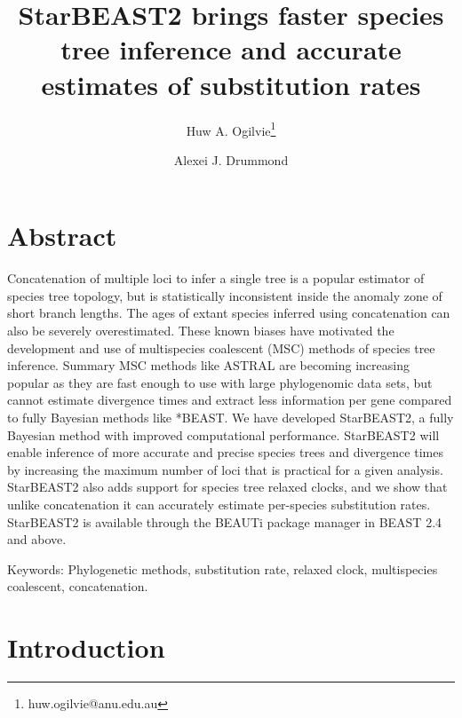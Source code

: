 \documentclass[12pt]{article}
\begin{document}
\title{StarBEAST2 brings faster species tree inference and accurate estimates of substitution rates}
\author[1,2]{Huw A. Ogilvie\thanks{huw.ogilvie@anu.edu.au}}
\author[2,3]{Alexei J. Drummond}

\maketitle

\clearpage

\justifying

\section*{Abstract}

Concatenation of multiple loci to infer a single tree is a popular estimator of
species tree topology, but is statistically inconsistent inside the anomaly zone
of short branch lengths. The ages of extant species inferred using concatenation
can also be severely overestimated. These known biases have motivated the
development and use of multispecies coalescent (MSC) methods of species tree
inference. Summary MSC methods like ASTRAL are becoming increasing popular as
they are fast enough to use with large phylogenomic data sets, but cannot
estimate divergence times and extract less information per gene compared to
fully Bayesian methods like *BEAST. We have developed StarBEAST2, a fully
Bayesian method with improved computational performance. StarBEAST2 will enable
inference of more accurate and precise species trees and divergence times by
increasing the maximum number of loci that is practical for a given analysis.
StarBEAST2 also adds support for species tree relaxed clocks, and we show that
unlike concatenation it can accurately estimate per-species substitution rates.
StarBEAST2 is available through the BEAUTi package manager in BEAST 2.4 and
above.

Keywords: Phylogenetic methods, substitution rate, relaxed clock, multispecies coalescent, concatenation.

\section*{Introduction}
\end{document}
